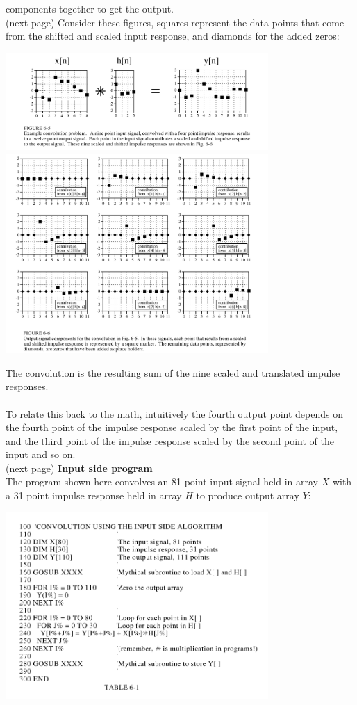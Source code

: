 \documentclass{report}
\begin{document}
components together to get the output.\\
(next page)\newpage
\noindent Consider these figures, squares represent the data points that come from the shifted and
scaled input response, and diamonds for the added zeros:
\begin{center}
\includegraphics[width=10cm]{a1}\\
\includegraphics[width=10cm]{a2}\\
\end{center}
The convolution is the resulting sum of the nine scaled and translated impulse responses.\\
\vspace{1mm}\\
To relate this back to the math, intuitively the fourth output point depends on the fourth point of the 
impulse response scaled by the first point of the input, and the third point of the impulse response scaled by 
the second point of the input and so on.\\
(next page)\newpage
\noindent\textbf{Input side program}\\
The program shown here convolves an 81 point input signal held in array $X$ with a 31 point impulse 
response held in array $H$ to produce output array $Y$:
\begin{center}
\includegraphics[width=10cm]{a3}\\
\end{center}
\end{document}
